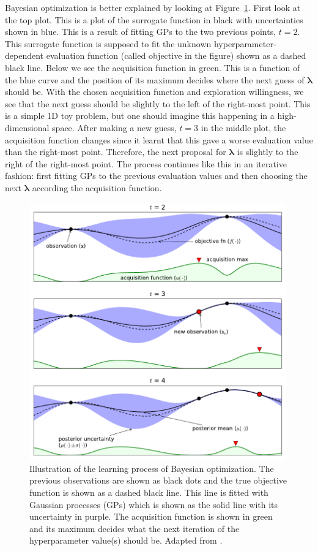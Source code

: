Bayesian optimization is better explained by looking at Figure~\ref{fig:ml:bayesian_optimization}. First look at the top plot. This is a plot of the surrogate function in black with uncertainties shown in blue. This is a result of fitting GPs to the two previous points, $t=2$. This surrogate function is supposed to fit the unknown hyperparameter-dependent evaluation function (called objective in the figure) shown as a dashed black line. Below we see the acquisition function in green. This is a function of the blue curve and the position of its maximum decides where the next guess of $\bm{\lambda}$ should be. With the chosen acquisition function and exploration willingness, we see that the next guess should be slightly to the left of the right-most point. This is a simple 1D toy problem, but one should imagine this happening in a high-dimensional space. After making a new guess, $t=3$ in the middle plot, the acquisition function changes since it learnt that this gave a worse evaluation value than the right-most point. Therefore, the next proposal for $\bm{\lambda}$ is slightly to the right of the right-most point. The process continues like this in an iterative fashion: first fitting GPs to the previous evaluation values and then choosing the next $\bm{\lambda}$ according the acquisition function. 

\begin{figure}
  \includegraphics[width=0.99\textwidth]{figures/bayesian_optimization/bo_full.pdf}
  \caption[Bayesian Optimization]{Illustration of the learning process of Bayesian optimization. The previous observations are shown as black dots and the true objective function is shown as a dashed black line. This line is fitted with Gaussian processes (GPs) which is shown as the solid line with its uncertainty in purple. The acquisition function is shown in green and its maximum decides what the next iteration of the hyperparameter value(s) should be. 
  Adapted from \citet{brochuTutorialBayesianOptimization2010}.}
  \label{fig:ml:bayesian_optimization}
\end{figure}

